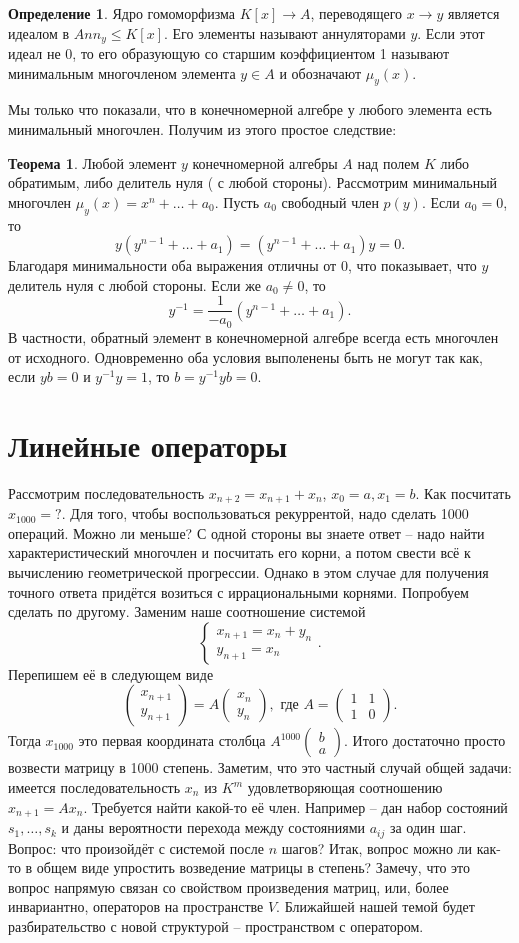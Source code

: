 \documentclass[10pt,a4paper,oneside]{book} %
\theoremstyle{definition}
\newtheorem*{defn}{Определение}
\newtheorem{thm}{Теорема}
\def\thrm{\begin{thm}}
\def\ethrm{\end{thm}}
\def\dfn{\begin{defn}}
\def\edfn{\end{defn}}
\def\pmat{\begin{pmatrix}}
\def\epmat{\end{pmatrix}}
\begin{document}
\dfn Ядро гомоморфизма $K[x] \to A$, переводящего $x \to y$ является идеалом в $Ann_y\leq K[x]$. Его элементы называют аннуляторами $y$. Если этот идеал не 0, то его образующую со старшим коэффициентом 1 называют минимальным многочленом элемента $y\in A$ и обозначают $\mu_y(x)$.
\edfn

Мы только что показали, что в конечномерной алгебре у любого элемента есть минимальный многочлен. Получим из этого простое следствие:

\thrm Любой элемент $y$ конечномерной алгебры $A$ над полем $K$ либо обратимым, либо делитель нуля ( с любой стороны).
\proof Рассмотрим минимальный многочлен $\mu_y(x)= x^n+ \dots+a_0$. Пусть $a_0$ свободный член $p(y)$. Если $a_0=0$, то $$y(y^{n-1}+
\dots + a_1)=(y^{n-1}+
\dots + a_1)y=0.$$ Благодаря минимальности оба выражения отличны от 0, что показывает, что $y$ делитель нуля с любой стороны. Если же $a_0\neq 0$, то $$y^{-1}=\frac{1}{-a_0}(y^{n-1}+
\dots + a_1).$$ В частности, обратный элемент в конечномерной алгебре всегда есть многочлен от исходного. Одновременно оба условия выполенены быть не могут так как, если $yb=0$ и $y^{-1}y=1$, то $b=y^{-1}yb=0$.
\endproof
\ethrm








\section{Линейные операторы}

Рассмотрим последовательность $x_{n+2}=x_{n+1}+x_{n}$, $x_0=a,x_1=b$. Как посчитать $x_{1000}=?$. Для того, чтобы воспользоваться рекуррентой, надо сделать 1000 операций. Можно ли меньше? С одной стороны вы знаете ответ -- надо найти характеристический многочлен и посчитать его корни, а потом свести всё к вычислению геометрической прогрессии.  Однако в этом случае для получения точного ответа придётся возиться с  иррациональными корнями. Попробуем сделать по другому. Заменим наше соотношение системой
$$ \begin{cases} x_{n+1}=x_n+y_n \\
y_{n+1}=x_{n}
\end{cases}.$$
Перепишем её в следующем виде
$$ \pmat x_{n+1}\\ y_{n+1}\epmat = A \pmat  x_{n}\\ y_n \epmat, \text{ где } A=\pmat 1& 1\\ 1& 0 \epmat.$$
Тогда  $x_{1000}$ это первая координата столбца $A^{1000} \pmat b\\ a\epmat $. Итого достаточно просто возвести матрицу в 1000 степень. Заметим, что это частный случай общей задачи: имеется последовательность $x_n$ из $K^m$ удовлетворяющая соотношению $x_{n+1}=Ax_n$. Требуется найти какой-то её член. Например -- дан  набор состояний $s_1,\dots,s_k$ и даны вероятности перехода между состояниями $a_{ij}$ за один шаг. Вопрос: что произойдёт с системой после $n$ шагов?
Итак, вопрос можно ли как-то в общем виде упростить возведение матрицы в степень? Замечу, что это вопрос напрямую связан со  свойством произведения матриц, или, более инвариантно,   операторов на пространстве $V$. Ближайшей нашей темой будет разбирательство с новой структурой -- пространством с оператором.
\end{document}
